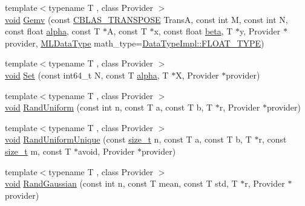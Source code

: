 \begin{DoxyCompactItemize}
{\footnotesize template$<$typename T , class Provider $>$ }\\\mbox{\hyperlink{mlasi_8h_a88f941d423cb2a819b70a1358982b1a6}{void}} \mbox{\hyperlink{namespaceonnxruntime_1_1math_af2b62cb055259e26d89f0ff4056b8e84}{Gemv}} (const \mbox{\hyperlink{cblas_8h_a44dfaddb823648755b110dbad849c5a9}{C\+B\+L\+A\+S\+\_\+\+T\+R\+A\+N\+S\+P\+O\+SE}} TransA, const int M, const int N, const float \mbox{\hyperlink{mlasi_8h_a1763355f32e1812e5cb3a0080e7cca12}{alpha}}, const T $\ast$A, const T $\ast$x, const float \mbox{\hyperlink{mlasi_8h_a5fd37d216981b4cd9a19e29b5acd48d4}{beta}}, T $\ast$y, Provider $\ast$provider, \mbox{\hyperlink{namespaceonnxruntime_ad77d0a6e838ec7da5dc35fed5ee66b49}{M\+L\+Data\+Type}} math\+\_\+type=\mbox{\hyperlink{math_8h_a41cf4177f569cb6b87ec5c90c0165769}{Data\+Type\+Impl\+::\+F\+L\+O\+A\+T\+\_\+\+T\+Y\+PE}})
\item 
{\footnotesize template$<$typename T , class Provider $>$ }\\\mbox{\hyperlink{mlasi_8h_a88f941d423cb2a819b70a1358982b1a6}{void}} \mbox{\hyperlink{namespaceonnxruntime_1_1math_a4b2f70ba41071f010f519fa8f1aca70b}{Set}} (const int64\+\_\+t N, const T \mbox{\hyperlink{mlasi_8h_a1763355f32e1812e5cb3a0080e7cca12}{alpha}}, T $\ast$X, Provider $\ast$provider)
\item 
{\footnotesize template$<$typename T , class Provider $>$ }\\\mbox{\hyperlink{mlasi_8h_a88f941d423cb2a819b70a1358982b1a6}{void}} \mbox{\hyperlink{namespaceonnxruntime_1_1math_add24214b0bdbbeb482af602e0811f4a5}{Rand\+Uniform}} (const int n, const T a, const T b, T $\ast$r, Provider $\ast$provider)
\item 
{\footnotesize template$<$typename T , class Provider $>$ }\\\mbox{\hyperlink{mlasi_8h_a88f941d423cb2a819b70a1358982b1a6}{void}} \mbox{\hyperlink{namespaceonnxruntime_1_1math_ac5727151c383866edef13ee7a9edd138}{Rand\+Uniform\+Unique}} (const \mbox{\hyperlink{mlasi_8h_a503efbc1c6e50825320ad909366b78ab}{size\+\_\+t}} n, const T a, const T b, T $\ast$r, const \mbox{\hyperlink{mlasi_8h_a503efbc1c6e50825320ad909366b78ab}{size\+\_\+t}} m, const T $\ast$avoid, Provider $\ast$provider)
\item 
{\footnotesize template$<$typename T , class Provider $>$ }\\\mbox{\hyperlink{mlasi_8h_a88f941d423cb2a819b70a1358982b1a6}{void}} \mbox{\hyperlink{namespaceonnxruntime_1_1math_a0bd243f8f7a07f1c3abd19a645e9b2cd}{Rand\+Gaussian}} (const int n, const T mean, const T std, T $\ast$r, Provider $\ast$provider)

\end{DoxyCompactItemize}
